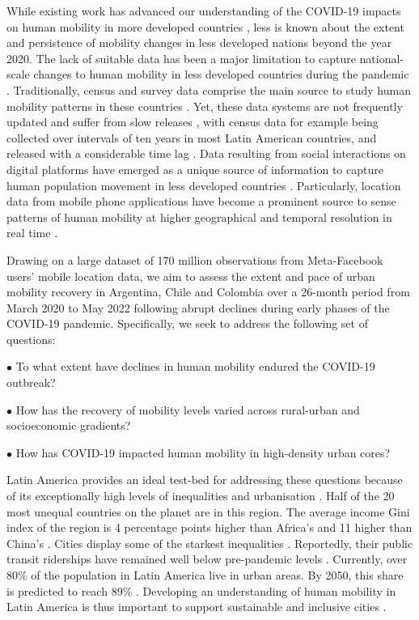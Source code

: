 \documentclass[fleqn,10pt]{wlscirep}
\begin{document}
While existing work has advanced our understanding of the COVID-19 impacts on human mobility in more developed countries \cite{gonzález-leonardo2022b, roweCalafiore2022, rowe2023, wang2022}, less is known about the extent and persistence of mobility changes in less developed nations beyond the year 2020. The lack of suitable data has been a major limitation to capture national-scale changes to human mobility in less developed countries during the pandemic \cite{ RoweCCA24}. Traditionally, census and survey data comprise the main source to study human mobility patterns in these countries \cite{bell2014}. Yet, these data systems are not frequently updated and suffer from slow releases \cite{rowe2023big, Cabrera-Arnau2023}, with census data for example being collected over intervals of ten years in most Latin American countries, and released with a considerable time lag \cite{bell2014}. Data resulting from social interactions on digital platforms have emerged as a unique source of information to capture human population movement in less developed countries \cite{rowe2023big}. Particularly, location data from mobile phone applications have become a prominent source to sense patterns of human mobility at higher geographical and temporal resolution in real time \cite{calafiore2023, iradukunda2025}.

Drawing on a large dataset of 170 million observations from Meta-Facebook users' mobile location data, we aim to assess the extent and pace of urban mobility recovery in Argentina, Chile and Colombia over a 26-month period from March 2020 to May 2022 following abrupt declines during early phases of the COVID-19 pandemic. Specifically, we seek to address the following set of questions:

$\bullet$ To what extent have declines in human mobility endured the COVID-19 outbreak? 
 
$\bullet$ How has the recovery of mobility levels varied across rural-urban and socioeconomic gradients?

$\bullet$ How has COVID-19 impacted human mobility in high-density urban cores?

Latin America provides an ideal test-bed for addressing these questions because of its exceptionally high levels of inequalities \cite{de2004inequality, carranza2023wealth} and urbanisation \cite{united2023world}. Half of the 20 most unequal countries on the planet are in this region. The average income Gini index of the region is 4 percentage points higher than Africa's and 11 higher than China's \cite{milanovic2016global}. Cities display some of the starkest inequalities \cite{habitat2022world}. Reportedly, their public transit riderships have remained well below pre-pandemic levels \cite{bloomberg2025transit}. Currently, over 80\% of the population in Latin America live in urban areas. By 2050, this share is predicted to reach 89\% \cite{habitat2022world}. Developing an understanding of human mobility in Latin America is thus important to support sustainable and inclusive cities \cite{habitat2022world}.
\end{document}
